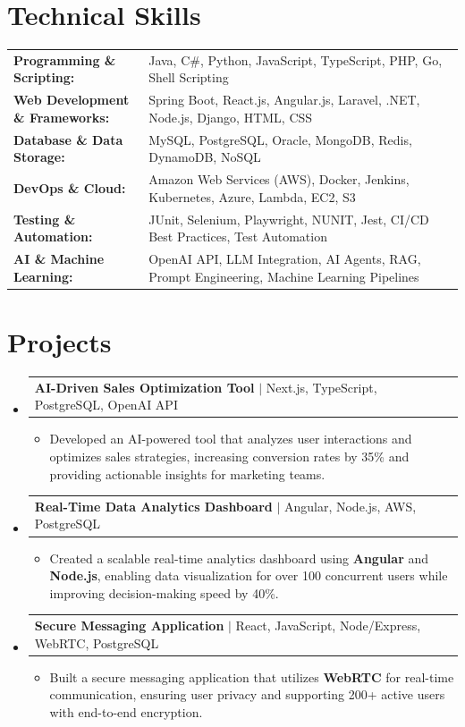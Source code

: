 \documentclass[letterpaper,10pt]{article}
\makeatletter
\newcommand{\resumeItem}[1]{
  \item{\fontsize{8pt}{9pt}\selectfont
    #1 \vspace{-3pt}
  }
}
\newcommand{\resumeProjectHeading}[2]{
    \item
    \begin{tabular*}{1.001\textwidth}{l@{\extracolsep{\fill}}r}
      \fontsize{8.5pt}{10pt}#1 & \textbf{\fontsize{8.5pt}{10pt} #2}\\
    \end{tabular*}\vspace{-7pt}
}
\newcommand{\resumeSubHeadingListStart}{\begin{itemize}[leftmargin=0pt, label={}]}
\newcommand{\resumeSubHeadingListEnd}{\end{itemize}}
\newcommand{\resumeItemListStart}{\begin{itemize}[leftmargin=*]}
\newcommand{\resumeItemListEnd}{\end{itemize}\vspace{-5pt}}
\makeatother
\begin{document}
\section{Technical Skills}
        \vspace{-14pt}
        \begin{table}[h]
            \fontsize{8pt}{9pt}\selectfont
            \begin{tabular}{p{0.3\linewidth} p{0.7\linewidth}}
                \textbf{Programming \& Scripting:} & Java, C\#, Python, JavaScript, TypeScript, PHP, Go, Shell Scripting \\
                \textbf{Web Development \& Frameworks:} & Spring Boot, React.js, Angular.js, Laravel, .NET, Node.js, Django, HTML, CSS \\
                \textbf{Database \& Data Storage:} & MySQL, PostgreSQL, Oracle, MongoDB, Redis, DynamoDB, NoSQL \\
                \textbf{DevOps \& Cloud:} & Amazon Web Services (AWS), Docker, Jenkins, Kubernetes, Azure, Lambda, EC2, S3 \\
                \textbf{Testing \& Automation:} & JUnit, Selenium, Playwright, NUNIT, Jest, CI/CD Best Practices, Test Automation \\
                \textbf{AI \& Machine Learning:} & OpenAI API, LLM Integration, AI Agents, RAG, Prompt Engineering, Machine Learning Pipelines \\
            \end{tabular}
        \end{table}
 \vspace{-18pt}

\section{Projects}
    \vspace{-5pt}
    \resumeSubHeadingListStart
          \resumeProjectHeading
            {\textbf{AI-Driven Sales Optimization Tool} $|$ Next.js, TypeScript, PostgreSQL, OpenAI API}{}
            \resumeItemListStart
                \resumeItem{Developed an AI-powered tool that analyzes user interactions and optimizes sales strategies, increasing conversion rates by 35\% and providing actionable insights for marketing teams.}
            \resumeItemListEnd
        \vspace{-12pt}
    
        \resumeProjectHeading
            {\textbf{Real-Time Data Analytics Dashboard} $|$ Angular, Node.js, AWS, PostgreSQL}{}
        \resumeItemListStart
                \resumeItem{Created a scalable real-time analytics dashboard using \textbf{Angular} and \textbf{Node.js}, enabling data visualization for over 100 concurrent users while improving decision-making speed by 40\%.}
        \resumeItemListEnd
      \vspace{-12pt}
      \resumeProjectHeading
        {\textbf{Secure Messaging Application} $|$ React, JavaScript, Node/Express, WebRTC, PostgreSQL}{}
    \resumeItemListStart
            \resumeItem{Built a secure messaging application that utilizes \textbf{WebRTC} for real-time communication, ensuring user privacy and supporting 200+ active users with end-to-end encryption.}
    \resumeItemListEnd
    \resumeSubHeadingListEnd
\end{document}
